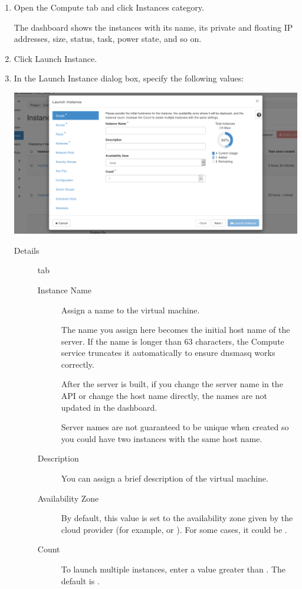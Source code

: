 \begin{enumerate}
\def\labelenumi{\arabic{enumi}.}
\item Open the Compute tab and click Instances category.

  The dashboard shows the instances with its name, its private and
  floating IP addresses, size, status, task, power state, and so on.
\item Click Launch Instance.
\item In the Launch Instance dialog box, specify the following values:

  \begin{center}
    \includegraphics[scale=0.5]{img/tab-compute-instances-launch.png}
  \end{center}
  
  \begin{description}
  \item[Details] tab
    \begin{description}
    \item[Instance Name] Assign a name to the virtual machine.

       The name you assign here becomes the initial host
      name of the server. If the name is longer than 63 characters,
      the Compute service truncates it automatically to ensure dnsmasq
      works correctly.

      After the server is built, if you change the server name in the
      API or change the host name directly, the names are not updated
      in the dashboard.

      Server names are not guaranteed to be unique when created so you
      could have two instances with the same host name.

    \item[Description] You can assign a brief description of the
      virtual machine.
    \item[Availability Zone] By default, this value is set to the
      availability zone given by the cloud provider (for example,
       or ).  For some cases, it
      could be .
    \item[Count] To launch multiple instances, enter a value greater
      than . The default is .
    \end{description}


\end{description}
\end{enumerate}
